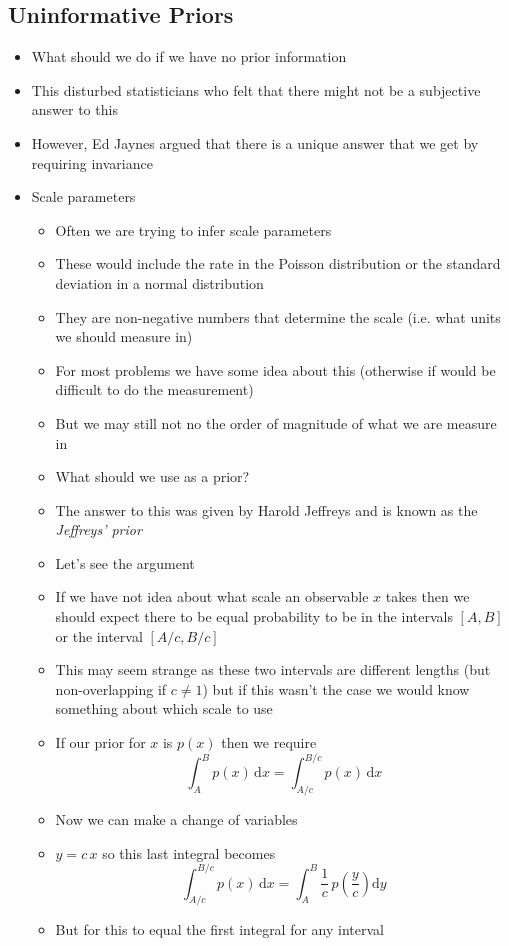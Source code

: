 \documentclass[11pt]{article}
\newcommand{\dd}{\mathrm{d}}
\begin{document}
\subsection{Uninformative Priors}
\label{sec:org98cbe6c}
\begin{itemize}
\item What should we do if we have no prior information
\item This disturbed statisticians who felt that there might not be a
subjective answer to this
\item However, Ed Jaynes argued that there is a unique answer that we
get by requiring invariance
\item Scale parameters
\begin{itemize}
\item Often we are trying to infer scale parameters
\item These would include the rate in the Poisson distribution or the
standard deviation in a normal distribution
\item They are non-negative numbers that determine the scale
(i.e. what units we should measure in)
\item For most problems we have some idea about this (otherwise if
would be difficult to do the measurement)
\item But we may still not no the order of magnitude of what we are
measure in
\item What should we use as a prior?
\item The answer to this was given by Harold Jeffreys and is known as
the \emph{Jeffreys' prior}
\item Let's see the argument
\item If we have not idea about what scale an observable \(x\) takes
then we should expect there to be equal probability to be in
the intervals \([A,B]\) or the interval \([A/c,B/c]\)
\item This may seem strange as these two intervals are different
lengths (but non-overlapping if \(c\neq1\)) but if this wasn't
the case we would know something about which scale to use
\item If our prior for \(x\) is \(p(x)\) then we require
$$ \int_A^B p(x)\,\dd x = \int_{A/c}^{B/c} p(x)\,\dd x $$
\item Now we can make a change of variables
\item \(y=c\,x\) so this last integral becomes
$$ \int_{A/c}^{B/c} p(x)\,\dd x = \int_A^B \frac{1}{c} \,
       p\!\left(\frac{y}{c}\right) \dd y$$
\item But for this to equal the first integral for any interval

\end{itemize}
\end{itemize}
\end{document}
